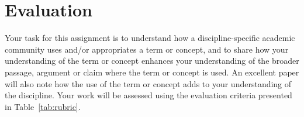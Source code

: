 \documentclass[10pt, oneside,twocolumn]{amsart}	%
\begin{document}
\section{Evaluation} %
\label{sec:rubric}
Your task for this assignment is to understand how a discipline-specific academic community uses and/or appropriates a term or concept, and to share how your understanding of the term or concept enhances your understanding of the broader passage, argument or claim where the term or concept is used.  An excellent paper will also note how the use of the term or concept adds to your understanding of the discipline.  Your work will be assessed using the evaluation criteria presented in Table~\ref{tab:rubric}.

\begin{comment}
	\section{Formatting} %
	\label{sec:formatting}
	As with the previous assignments, you are expected to use \textsc{mla} formatting conventions, including:
	\begin{itemize}
		\item double-spaced lines,
		\item one-inch margins on all sides and half-inch indents for paragraphs,
		\item a 12-point typeface with serifs (like Times New Roman, \emph{not} Calibri), and
		\item parenthetical citations, where appropriate, and a Works Cited page.
	\end{itemize}
\end{comment}
\end{document}
